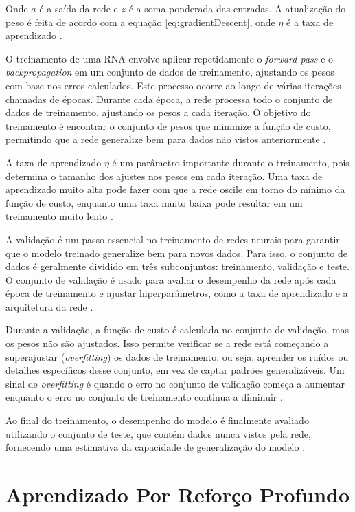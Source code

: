 Onde $a$ é a saída da rede e $z$ é a soma ponderada das entradas. A atualização do peso é feita de acordo com a equação \eqref{eq:gradientDescent}, onde $\eta$ é a taxa de aprendizado \cite{goodfellow2016deep}.

O treinamento de uma RNA envolve aplicar repetidamente o \textit{forward pass} e o \textit{backpropagation} em um conjunto de dados de treinamento, ajustando os pesos com base nos erros calculados. Este processo ocorre ao longo de várias iterações chamadas de épocas. Durante cada época, a rede processa todo o conjunto de dados de treinamento, ajustando os pesos a cada iteração. O objetivo do treinamento é encontrar o conjunto de pesos que minimize a função de custo, permitindo que a rede generalize bem para dados não vistos anteriormente \cite{lecun2015deep}.

A taxa de aprendizado $\eta$ é um parâmetro importante durante o treinamento, pois determina o tamanho dos ajustes nos pesos em cada iteração. Uma taxa de aprendizado muito alta pode fazer com que a rede oscile em torno do mínimo da função de custo, enquanto uma taxa muito baixa pode resultar em um treinamento muito lento \cite{haykin2008neural}.

A validação é um passo essencial no treinamento de redes neurais para garantir que o modelo treinado generalize bem para novos dados. Para isso, o conjunto de dados é geralmente dividido em três subconjuntos: treinamento, validação e teste. O conjunto de validação é usado para avaliar o desempenho da rede após cada época de treinamento e ajustar hiperparâmetros, como a taxa de aprendizado e a arquitetura da rede \cite{goodfellow2016deep}.

Durante a validação, a função de custo é calculada no conjunto de validação, mas os pesos não são ajustados. Isso permite verificar se a rede está começando a superajustar (\textit{overfitting}) os dados de treinamento, ou seja, aprender os ruídos ou detalhes específicos desse conjunto, em vez de captar padrões generalizáveis. Um sinal de \textit{overfitting} é quando o erro no conjunto de validação começa a aumentar enquanto o erro no conjunto de treinamento continua a diminuir \cite{nielsen2015neural}.

Ao final do treinamento, o desempenho do modelo é finalmente avaliado utilizando o conjunto de teste, que contém dados nunca vistos pela rede, fornecendo uma estimativa da capacidade de generalização do modelo \cite{goodfellow2016deep}.

\section{Aprendizado Por Reforço Profundo}

